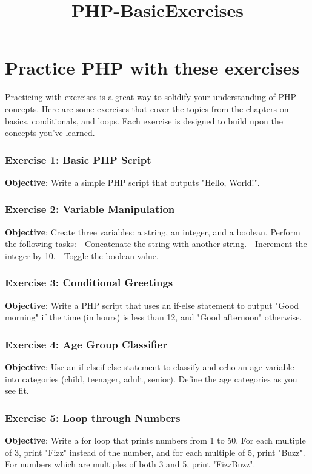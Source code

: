 \documentclass[11pt]{article}
\date{}
\title{PHP-BasicExercises}
\begin{document}
\maketitle
\setcounter{tocdepth}{3}
\tableofcontents

\setlength\parindent{10pt}

\section{Practice PHP with these exercises}
\label{sec:orgfa69c1d}
Practicing with exercises is a great way to solidify your understanding
of PHP concepts. Here are some exercises that cover the topics from the
chapters on basics, conditionals, and loops. Each exercise is designed
to build upon the concepts you've learned.

\subsubsection{Exercise 1: Basic PHP Script}
\label{sec:org6629d79}
\textbf{Objective}: Write a simple PHP script that outputs "Hello, World!".

\subsubsection{Exercise 2: Variable Manipulation}
\label{sec:orgefb47da}
\textbf{Objective}: Create three variables: a string, an integer, and a
boolean. Perform the following tasks: - Concatenate the string with
another string. - Increment the integer by 10. - Toggle the boolean
value.

\subsubsection{Exercise 3: Conditional Greetings}
\label{sec:orga7a6ad6}
\textbf{Objective}: Write a PHP script that uses an if-else statement to output
"Good morning" if the time (in hours) is less than 12, and "Good
afternoon" otherwise.

\subsubsection{Exercise 4: Age Group Classifier}
\label{sec:org3cfee83}
\textbf{Objective}: Use an if-elseif-else statement to classify and echo an age
variable into categories (child, teenager, adult, senior). Define the
age categories as you see fit.

\subsubsection{Exercise 5: Loop through Numbers}
\label{sec:org3fe3d06}
\textbf{Objective}: Write a for loop that prints numbers from 1 to 50. For each
multiple of 3, print "Fizz" instead of the number, and for each multiple
of 5, print "Buzz". For numbers which are multiples of both 3 and 5,
print "FizzBuzz".
\end{document}
